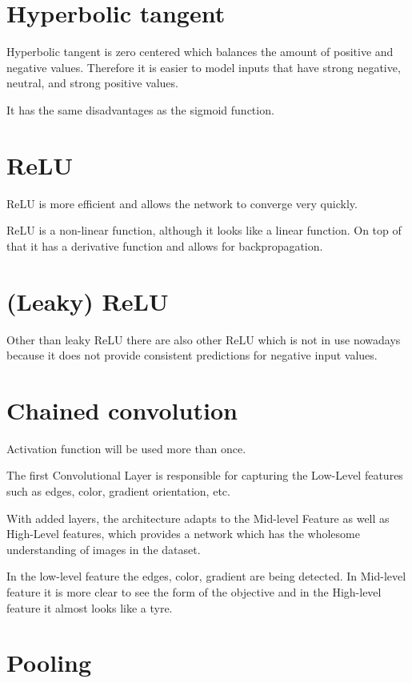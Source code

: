 \documentclass[a4paper,13pt,twoside]{book}
\begin{document}
\section{Hyperbolic tangent}

Hyperbolic tangent is zero centered which balances the amount of positive and negative values. Therefore it is easier to model inputs that have strong negative, neutral, and strong positive values.

It has the same disadvantages as the sigmoid function.

\section{ReLU}

ReLU is more efficient and allows the network to converge very quickly.

ReLU is a non-linear function, although it looks like a linear function. On top of that it has a derivative function and allows for backpropagation.

\section{(Leaky) ReLU}

Other than leaky ReLU there are also other ReLU which is not in use nowadays because it does not provide consistent predictions for negative input values.

\section{Chained convolution}

Activation function will be used more than once.

The first Convolutional Layer is responsible for capturing the Low-Level features such as edges, color, gradient orientation, etc.

With added layers, the architecture adapts to the Mid-level Feature as well as High-Level features, which provides a network which has the wholesome understanding of images in the dataset.

In the low-level feature the edges, color, gradient are being detected. In Mid-level feature it is more clear to see the form of the objective and in the High-level feature it almost looks like a tyre.

\section{Pooling}
\end{document}
